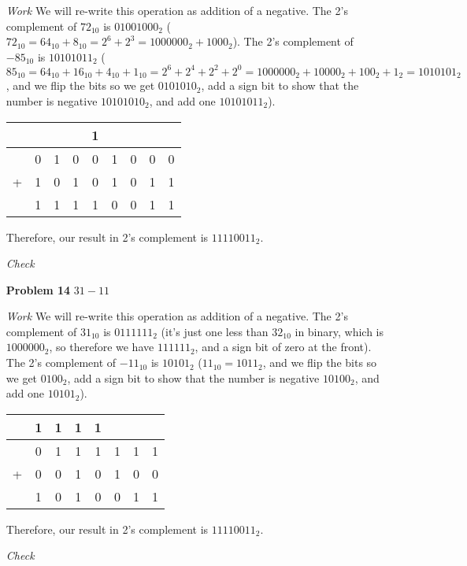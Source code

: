 \documentclass[12pt]{article}
\begin{document}
\begin{enumerate}
  \item[\textit{Work}] We will re-write this operation as addition of a negative. The 2's complement of $72_{10}$ is $01001000_2$ ($72_{10}=64_{10}+8_{10}=2^6+2^3=1000000_2+1000_2$). The 2's complement of $-85_{10}$ is $10101011_2$ ($85_{10}=64_{10}+16_{10}+4_{10}+1_{10}=2^6+2^4+2^2+2^0=1000000_2+10000_2+100_2+1_2=1010101_2$, and we flip the bits so we get $0101010_2$, add a sign bit to show that the number is negative $10101010_2$, and add one $10101011_2$).
  \item[]
  \begin{center}
    \begin{tabular}{c@{\,}c@{\,}c@{\,}c@{\,}c@{\,}c@{\,}c@{\,}c@{\,}c}
      &   &   &   & 1 &   &   &   &   \\    \hline
      & 0 & 1 & 0 & 0 & 1 & 0 & 0 & 0 \\
    + & 1 & 0 & 1 & 0 & 1 & 0 & 1 & 1 \\    \hline
      & 1 & 1 & 1 & 1 & 0 & 0 & 1 & 1
    \end{tabular}
  \end{center}
  \item[] Therefore, our result in 2's complement is $11110011_2$.
  \item[\textit{Check}]
\end{enumerate}


\begin{enumerate}
  \item[\textbf{Problem 14}] $31-11$
\end{enumerate}

\begin{enumerate}
  \item[\textit{Work}] We will re-write this operation as addition of a negative. The 2's complement of $31_{10}$ is $0111111_2$ (it's just one less than $32_{10}$ in binary, which is $1000000_2$, so therefore we have $111111_2$, and a sign bit of zero at the front). The 2's complement of $-11_{10}$ is $10101_2$ ($11_{10}=1011_2$, and we flip the bits so we get $0100_2$, add a sign bit to show that the number is negative $10100_2$, and add one $10101_2$).
  \item[]
  \begin{center}
    \begin{tabular}{c@{\,}c@{\,}c@{\,}c@{\,}c@{\,}c@{\,}c@{\,}c}
      & 1 & 1 & 1 & 1 &   &   &   \\    \hline
      & 0 & 1 & 1 & 1 & 1 & 1 & 1 \\
    + & 0 & 0 & 1 & 0 & 1 & 0 & 0 \\    \hline
      & 1 & 0 & 1 & 0 & 0 & 1 & 1
    \end{tabular}
  \end{center}
  \item[] Therefore, our result in 2's complement is $11110011_2$.
  \item[\textit{Check}]
\end{enumerate}
\end{document}
